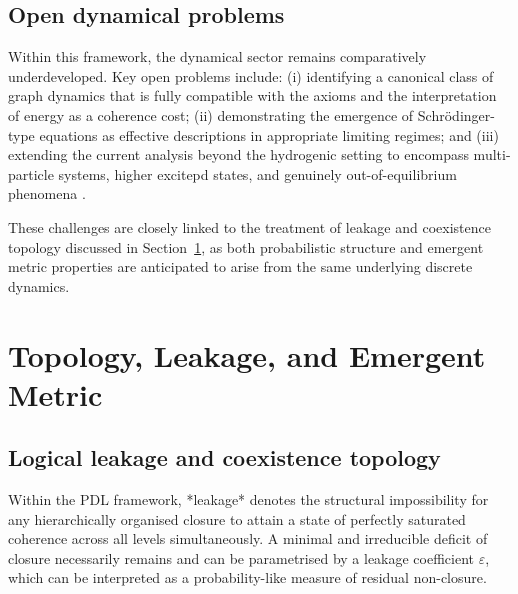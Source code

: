 \documentclass{article}
\begin{document}
\subsection{Open dynamical problems}
\label{subsec:dynamical_open}

Within this framework, the dynamical sector remains comparatively underdeveloped. Key open problems include: (i) identifying a canonical class of graph dynamics that is fully compatible with the axioms and the interpretation of energy as a coherence cost; (ii) demonstrating the emergence of Schrödinger-type equations as effective descriptions in appropriate limiting regimes; and (iii) extending the current analysis beyond the hydrogenic setting to encompass multi-particle systems, higher excitepd states, and genuinely out-of-equilibrium phenomena
\citep{Coherence_Leakage_18_2026,PDL_position}.

These challenges are closely linked to the treatment of leakage and coexistence topology discussed in Section~\ref{sec:topology_metric}, as both probabilistic structure and emergent metric properties are anticipated to arise from the same underlying discrete dynamics.

\section{Topology, Leakage, and Emergent Metric}
\label{sec:topology_metric}

\subsection{Logical leakage and coexistence topology}
\label{subsec:leakage_coexistence}

Within the PDL framework, *leakage* denotes the structural impossibility for any hierarchically organised closure to attain a state of perfectly saturated coherence across all levels simultaneously. A minimal and irreducible deficit of closure necessarily remains and can be parametrised by a leakage coefficient $\varepsilon$, which can be interpreted as a probability-like measure of residual non-closure.\cite{Topological_Reformulation_PDL_2026} 
\end{document}
